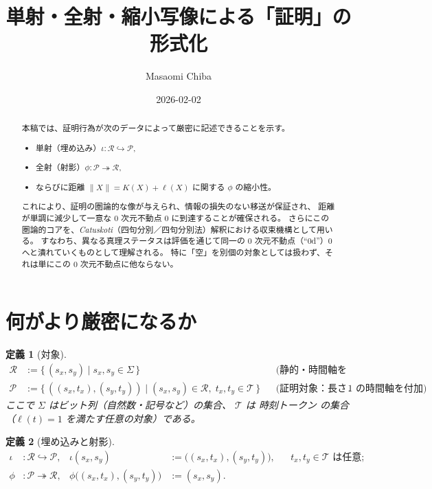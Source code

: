 \documentclass[12pt,a4paper]{article}
\newcommand{\dfix}{\mathfrak{0}}          %
\newcommand{\Rep}{\mathcal{R}}           %
\newcommand{\Prf}{\mathcal{P}}           %
\newcommand{\Tset}{\mathcal{T}}          %
\newtheorem{definition}{定義}[section]
\begin{document}
\title{単射・全射・縮小写像による「証明」の形式化}
\author{Masaomi Chiba}
\date{2026-02-02}
\maketitle

\begin{abstract}
本稿では、証明行為が次のデータによって厳密に記述できることを示す。
\begin{itemize}[nosep]
  \item 単射（埋め込み）$\iota\colon\Rep\hookrightarrow\Prf$,
  \item 全射（射影）$\phi\colon\Prf\twoheadrightarrow\Rep$,
  \item ならびに距離 $\|X\|=K(X)+\ell(X)$ に関する $\phi$ の縮小性。
\end{itemize}
これにより、証明の圏論的な像が与えられ、情報の損失のない移送が保証され、
距離が単調に減少して一意な $0$ 次元不動点 $\dfix$ に到達することが確保される。
さらにこの圏論的コアを、\emph{Catuskoti}（四句分別／四句分別法）解釈における収束機構として用いる。
すなわち、異なる真理ステータスは評価を通じて同一の $0$ 次元不動点（``0d''）$\dfix$ へと潰れていくものとして理解される。
特に「空」を別個の対象としては扱わず、それは単にこの $0$ 次元不動点に他ならない。
\end{abstract}

\section{何がより厳密になるか}

\begin{definition}[対象]
$$
\begin{aligned}
\Rep &:= \{\, (s_x,s_y)\mid s_x,s_y\in\Sigma \,\}
      &&\text{(静的・時間軸を持たない情報)}\\[2mm]
\Prf &:= \{\, ((s_x,t_x),(s_y,t_y))
          \mid (s_x,s_y)\in\Rep,\;t_x,t_y\in\Tset \,\}
      &&\text{(証明対象：長さ $1$ の時間軸を付加)} .
\end{aligned}
$$
ここで $\Sigma$ はビット列（自然数・記号など）の集合、
$\Tset$ は \emph{時刻トークン} の集合（$\ell(t)=1$ を満たす任意の対象）である。
\end{definition}

\begin{definition}[埋め込みと射影]
$$
\begin{aligned}
\iota &: \Rep\hookrightarrow\Prf,
        &\iota(s_x,s_y)&:=\bigl((s_x,t_x),(s_y,t_y)\bigr),
        &&t_x,t_y\in\Tset\text{ は任意};\\[2mm]
\phi &: \Prf\twoheadrightarrow\Rep,
        &\phi\bigl((s_x,t_x),(s_y,t_y)\bigr)&:=(s_x,s_y).
\end{aligned}
$$
\end{definition}
\end{document}

